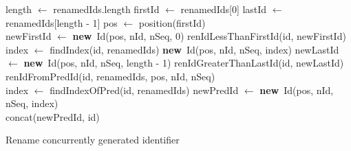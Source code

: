 \documentclass[10pt,journal,compsoc]{IEEEtran}
\let\MYoriglatexcaption\caption
\renewcommand{\caption}[2][\relax]{\MYoriglatexcaption[#2]{#2}}
\newcommand{\new}{\textbf{new}}
\begin{document}
\begin{myalgorithm}
    \begin{algorithmic}
            \State length $\gets$ renamedIds.length
            \State firstId $\gets$ renamedIds[0]
            \State lastId $\gets$ renamedIds[length - 1]
            \State pos $\gets$ position(firstId)
            \\
                \State newFirstId $\gets$ \new~Id(pos, nId, nSeq, 0)
                \State \Return renIdLessThanFirstId(id, newFirstId)
                \State index $\gets$ findIndex(id, renamedIds)
                \State \Return \new~Id(pos, nId, nSeq, index)
                \State newLastId $\gets$ \new~Id(pos, nId, nSeq, length - 1)
                \State \Return renIdGreaterThanLastId(id, newLastId)
            \Else
                \State \Return renIdFromPredId(id, renamedIds, pos, nId, nSeq)
            \EndIf
        \EndFunction
        \\
            \State index $\gets$ findIndexOfPred(id, renamedIds)
            \State newPredId $\gets$ \new~Id(pos, nId, nSeq, index)
            \\
            \State \Return concat(newPredId, id)
        \EndFunction
    \end{algorithmic}
    \caption{Rename concurrently generated identifier}
    \label{alg:renameId}
\end{myalgorithm}
\end{document}
